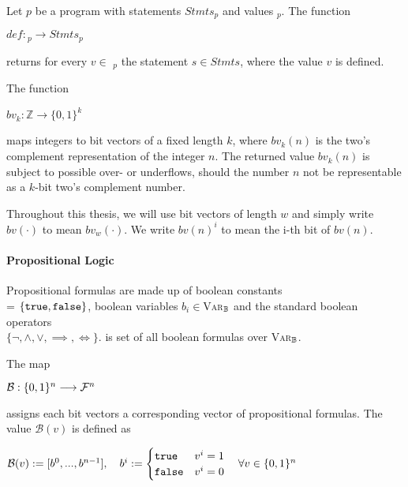 \begin{definition}
    Let $p$ be a program with statements $Stmts_p$ and values \val$_p$. The function
    \begin{center}
        $def: $\val$_p \longrightarrow Stmts_p$
    \end{center}
    returns for every $v \in$ \val$_p$ the statement $s \in Stmts$, where the value $v$ is defined.
\end{definition}

\begin{definition}
    The function
    \begin{center}
        $bv_k: \mathbb{Z} \longrightarrow \{0, 1\}^k$
    \end{center}
    maps integers to bit vectors of a fixed length $k$, where $bv_k(n)$ is the two's complement representation of the integer $n$.
    The returned value $bv_k(n)$ is subject to possible over- or underflows, should the number $n$ not be representable as a $k$-bit two's complement number.

    Throughout this thesis, we will use bit vectors of length $w$ and simply write $bv(\cdot)$ to mean $bv_w(\cdot)$. We write $bv(n)^i$ to mean the i-th bit of $bv(n)$.
\end{definition}

\paragraph{Propositional Logic}
Propositional formulas are made up of boolean constants \\ \bool = $\{ \mathtt{true}, \mathtt{false} \}$, boolean variables $b_i \in $\textsc{Var}$_{\mathbb{B}}$ and the standard boolean operators \\$\{ \lnot, \land, \lor, \implies, \iff \}$. \bform is set of all boolean formulas over \textsc{Var}$_{\mathbb{B}}$.

\begin{definition}
    The map
    \begin{center}
        $\mathcal{B}: \{0, 1\}^n \longrightarrow  \mathcal{F}^n$
    \end{center}
    assigns each bit vectors a corresponding vector of propositional formulas. The value $\mathcal{B}(v)$ is defined as
    \begin{center}
        $\mathcal{B}(v) := [b^0, ..., b^{n-1}], \hspace{1em} b^i := \begin{cases}
            \mathtt{true} & v^i = 1 \\
            \mathtt{false} & v^i = 0
        \end{cases} \hspace{1em} \forall v \in \{0, 1\}^n$
    \end{center}
\end{definition}

